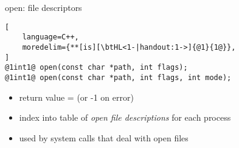 \begin{frame}[fragile,label=openExplainFDs]{open: file descriptors}
\begin{lstlisting}[
    language=C++,
    moredelim={**[is][\btHL<1-|handout:1->]{@1}{1@}},
]
@1int1@ open(const char *path, int flags);
@1int1@ open(const char *path, int flags, int mode);
\end{lstlisting}
\begin{itemize}
\item return value =  {\small (or -1 on error)}
\item index into table of \textit{open file descriptions} for each process
\item used by system calls that deal with open files
\end{itemize}
\end{frame}

